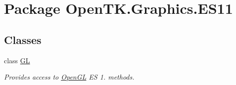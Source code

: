\hypertarget{namespace_open_t_k_1_1_graphics_1_1_e_s11}{\section{Package Open\-T\-K.\-Graphics.\-E\-S11}
\label{namespace_open_t_k_1_1_graphics_1_1_e_s11}
}
\subsection*{Classes}
\begin{DoxyCompactItemize}
\item 
class \hyperlink{class_open_t_k_1_1_graphics_1_1_e_s11_1_1_g_l}{G\-L}
\begin{DoxyCompactList}\small\item\em Provides access to \hyperlink{namespace_open_t_k_1_1_graphics_1_1_open_g_l}{Open\-G\-L} E\-S 1. methods. \end{DoxyCompactList}\end{DoxyCompactItemize}
